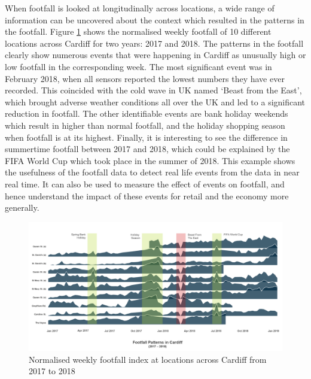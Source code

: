 When footfall is looked at longitudinally across locations, a wide range of information can be uncovered about the context which resulted in the patterns in the footfall. 
Figure \ref{figure:applications:cardiff} shows the normalised weekly footfall of 10 different locations across Cardiff for two years: 2017 and 2018. 
The patterns in the footfall clearly show numerous events that were happening in Cardiff as unusually high or low footfall in the corresponding week. 
The most significant event was in February 2018, when all sensors reported the lowest numbers they have ever recorded. 
This coincided with the cold wave in UK named ‘Beast from the East’, which brought adverse weather conditions all over the UK and led to a significant reduction in footfall. 
The other identifiable events are bank holiday weekends which result in higher than normal footfall, and the holiday shopping season when footfall is at its highest. 
Finally, it is interesting to see the difference in summertime footfall between 2017 and 2018, which could be explained by the FIFA World Cup which took place in the summer of 2018. 
This example shows the usefulness of the footfall data to detect real life events from the data in near real time. 
It can also be used to measure the effect of events on footfall, and hence understand the impact of these events for retail and the  economy more generally.

\begin{figure}
  \includegraphics[trim={0 50 0 0},clip]{images/applications-cardiff-footfall.png}
  \caption{Normalised weekly footfall index at locations across Cardiff from 2017 to 2018}
  \label{figure:applications:cardiff}
\end{figure}

